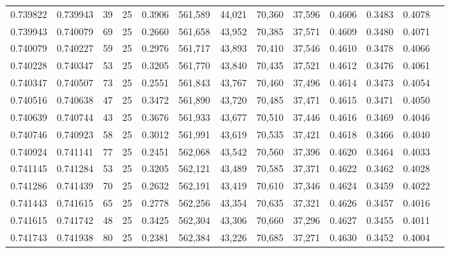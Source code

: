 \begin{tabular}{rrrrrrrrrrrrr}
0.739822 & 0.739943 &    39 &  25 &                                     0.3906 & 561,589 &  44,021 &  70,360 &  37,596 & 0.4606 & 0.3483 & 0.4078 \\
0.739943 & 0.740079 &    69 &  25 &                                     0.2660 & 561,658 &  43,952 &  70,385 &  37,571 & 0.4609 & 0.3480 & 0.4071 \\
0.740079 & 0.740227 &    59 &  25 &                                     0.2976 & 561,717 &  43,893 &  70,410 &  37,546 & 0.4610 & 0.3478 & 0.4066 \\
0.740228 & 0.740347 &    53 &  25 &                                     0.3205 & 561,770 &  43,840 &  70,435 &  37,521 & 0.4612 & 0.3476 & 0.4061 \\
0.740347 & 0.740507 &    73 &  25 &                                     0.2551 & 561,843 &  43,767 &  70,460 &  37,496 & 0.4614 & 0.3473 & 0.4054 \\
0.740516 & 0.740638 &    47 &  25 &                                     0.3472 & 561,890 &  43,720 &  70,485 &  37,471 & 0.4615 & 0.3471 & 0.4050 \\
0.740639 & 0.740744 &    43 &  25 &                                     0.3676 & 561,933 &  43,677 &  70,510 &  37,446 & 0.4616 & 0.3469 & 0.4046 \\
0.740746 & 0.740923 &    58 &  25 &                                     0.3012 & 561,991 &  43,619 &  70,535 &  37,421 & 0.4618 & 0.3466 & 0.4040 \\
0.740924 & 0.741141 &    77 &  25 &                                     0.2451 & 562,068 &  43,542 &  70,560 &  37,396 & 0.4620 & 0.3464 & 0.4033 \\
0.741145 & 0.741284 &    53 &  25 &                                     0.3205 & 562,121 &  43,489 &  70,585 &  37,371 & 0.4622 & 0.3462 & 0.4028 \\
0.741286 & 0.741439 &    70 &  25 &                                     0.2632 & 562,191 &  43,419 &  70,610 &  37,346 & 0.4624 & 0.3459 & 0.4022 \\
0.741443 & 0.741615 &    65 &  25 &                                     0.2778 & 562,256 &  43,354 &  70,635 &  37,321 & 0.4626 & 0.3457 & 0.4016 \\
0.741615 & 0.741742 &    48 &  25 &                                     0.3425 & 562,304 &  43,306 &  70,660 &  37,296 & 0.4627 & 0.3455 & 0.4011 \\
0.741743 & 0.741938 &    80 &  25 &                                     0.2381 & 562,384 &  43,226 &  70,685 &  37,271 & 0.4630 & 0.3452 & 0.4004 \\

\end{tabular}
